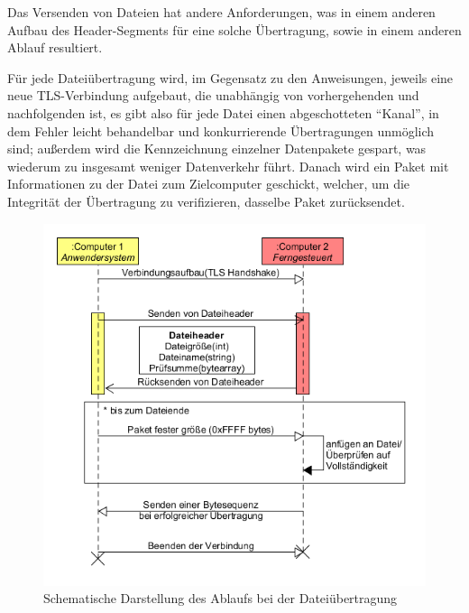 Das Versenden von Dateien hat andere Anforderungen, was in einem anderen Aufbau des Header-Segments für eine solche Übertragung, sowie in einem anderen Ablauf resultiert.\par
Für jede Dateiübertragung wird, im Gegensatz zu den Anweisungen, jeweils eine neue TLS-Verbindung aufgebaut, die unabhängig von vorhergehenden und nachfolgenden ist, es gibt also für jede Datei einen abgeschotteten "`Kanal"', in dem Fehler leicht behandelbar und konkurrierende Übertragungen unmöglich sind; außerdem wird die Kennzeichnung einzelner Datenpakete gespart, was wiederum zu insgesamt weniger Datenverkehr führt.
Danach wird ein Paket mit Informationen zu der Datei zum Zielcomputer geschickt, welcher, um die Integrität der Übertragung zu verifizieren, dasselbe Paket zurücksendet.\\

\begin{figure}
\includegraphics[scale=.4]{diagramFileProtocol}
\caption{Schematische Darstellung des Ablaufs bei der Dateiübertragung}
\label{file_diagram}
\end{figure}


